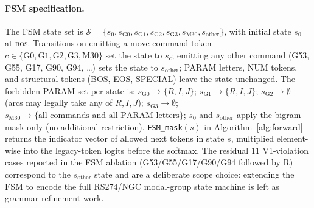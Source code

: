 \documentclass[sensors,article,submit,moreauthors,pdftex]{Definitions/mdpi}
\begin{document}
\paragraph{FSM specification.} The FSM state set is $\mathcal{S}=\{s_0, s_{\text{G0}}, s_{\text{G1}}, s_{\text{G2}}, s_{\text{G3}}, s_{\text{M30}}, s_{\text{other}}\}$, with initial state $s_0$ at \textsc{bos}. Transitions on emitting a move-command token $c\in\{\text{G0},\text{G1},\text{G2},\text{G3},\text{M30}\}$ set the state to $s_c$; emitting any other command (G53, G55, G17, G90, G94, \ldots) sets the state to $s_{\text{other}}$; PARAM letters, NUM tokens, and structural tokens (BOS, EOS, SPECIAL) leave the state unchanged. The forbidden-PARAM set per state is: $s_{\text{G0}}\!\to\!\{R, I, J\}$; $s_{\text{G1}}\!\to\!\{R, I, J\}$; $s_{\text{G2}}\!\to\!\emptyset$ (arcs may legally take any of $R, I, J$); $s_{\text{G3}}\!\to\!\emptyset$; $s_{\text{M30}}\!\to\!\{\text{all commands and all PARAM letters}\}$; $s_0$ and $s_{\text{other}}$ apply the bigram mask only (no additional restriction). \texttt{FSM\_mask}$(s)$ in Algorithm~\ref{alg:forward} returns the indicator vector of allowed next tokens in state $s$, multiplied element-wise into the legacy-token logits before the softmax. The residual $11$ V1-violation cases reported in the FSM ablation (G53/G55/G17/G90/G94 followed by R) correspond to the $s_{\text{other}}$ state and are a deliberate scope choice: extending the FSM to encode the full RS274/NGC modal-group state machine is left as grammar-refinement work.
\end{document}
